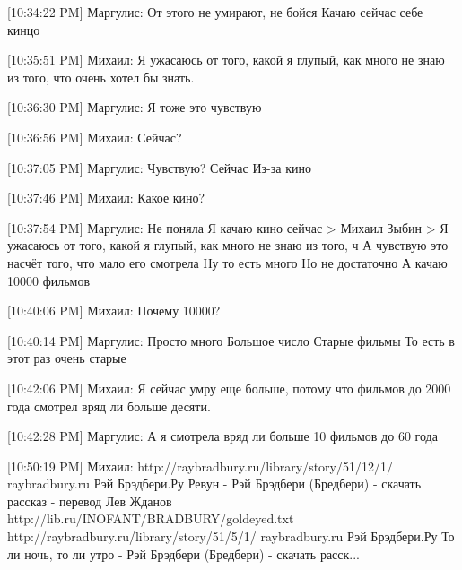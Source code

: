 \documentclass{article}
\begin{document}
[10:34:22 PM] Маргулис:
От этого не умирают, не бойся
 Качаю сейчас себе кинцо

[10:35:51 PM] Михаил:
Я ужасаюсь от того, какой я глупый, как много не знаю из того, что очень хотел бы знать.

[10:36:30 PM] Маргулис:
Я тоже это чувствую

[10:36:56 PM] Михаил:
Сейчас?

[10:37:05 PM] Маргулис:
Чувствую?
 Сейчас
 Из-за кино

[10:37:46 PM] Михаил:
Какое кино?

[10:37:54 PM] Маргулис:
Не поняла
 Я качаю кино сейчас
> Михаил Зыбин
> Я ужасаюсь от того, какой я глупый, как много не знаю из того, ч
А чувствую это насчёт того, что мало его смотрела
 Ну то есть много
 Но не достаточно
 А качаю 10000 фильмов

[10:40:06 PM] Михаил:
Почему 10000?

[10:40:14 PM] Маргулис:
Просто много
 Большое число
 Старые фильмы
 То есть в этот раз очень старые

[10:42:06 PM] Михаил:
Я сейчас умру еще больше, потому что фильмов до 2000 года смотрел вряд ли больше десяти.

[10:42:28 PM] Маргулис:
А я смотрела вряд ли больше 10 фильмов до 60 года

[10:50:19 PM] Михаил:
http://raybradbury.ru/library/story/51/12/1/
raybradbury.ru
Рэй Брэдбери.Ру Ревун - Рэй Брэдбери (Бредбери) - скачать рассказ - перевод Лев Жданов
 http://lib.ru/INOFANT/BRADBURY/goldeyed.txt
 http://raybradbury.ru/library/story/51/5/1/
raybradbury.ru
Рэй Брэдбери.Ру То ли ночь, то ли утро - Рэй Брэдбери (Бредбери) - скачать расск...
\end{document}

